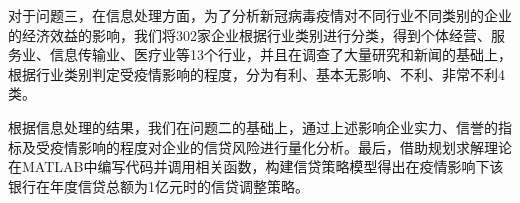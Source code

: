 对于问题三，在信息处理方面，为了分析新冠病毒疫情对不同行业不同类别的企业的经济效益的影响，我们将302家企业根据行业类别进行分类，得到个体经营、服务业、信息传输业、医疗业等13个行业，并且在调查了大量研究和新闻的基础上，根据行业类别判定受疫情影响的程度，分为有利、基本无影响、不利、非常不利4类。

根据信息处理的结果，我们在问题二的基础上，通过上述影响企业实力、信誉的指标及受疫情影响的程度对企业的信贷风险进行量化分析。最后，借助规划求解理论在MATLAB中编写代码并调用相关函数，构建信贷策略模型得出在疫情影响下该银行在年度信贷总额为1亿元时的信贷调整策略。



\ifx\allfiles\undefined

\fi